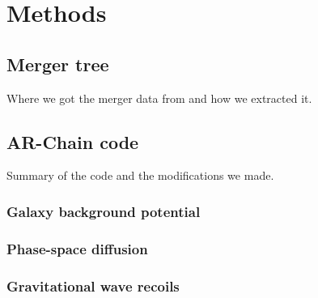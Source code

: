 \section{Methods}

\subsection{Merger tree}
Where we got the merger data from and how we extracted it.

\subsection{AR-Chain code}
Summary of the code and the modifications we made.

\subsubsection{Galaxy background potential}

\subsubsection{Phase-space diffusion}

\subsubsection{Gravitational wave recoils}



